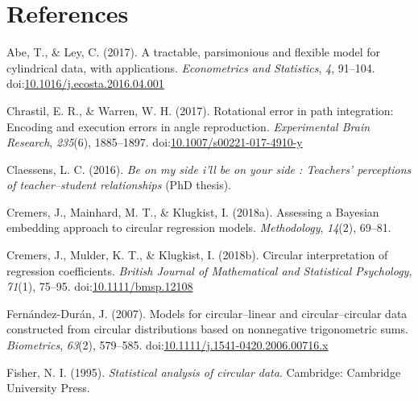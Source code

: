 \documentclass[man,mask]{apa6}
\DeclareRobustCommand{\VANDER}[3]{#2}
\DeclareRobustCommand{\VAN}[3]{#2}
\DeclareRobustCommand{\DEN}[3]{#2}
\begin{document}
\newpage
\vspace{-0.75cm}
\section*{{\normalfont References}}
\vspace{-0.75cm}

\DeclareRobustCommand{\VANDER}[3]{#3}
\DeclareRobustCommand{\VAN}[3]{#3}
\DeclareRobustCommand{\DEN}[3]{#3}

\hypertarget{refs}{}
\leavevmode\hypertarget{ref-abe2017tractable}{}%
Abe, T., \& Ley, C. (2017). A tractable, parsimonious and flexible model for cylindrical data, with applications. \emph{Econometrics and Statistics}, \emph{4}, 91--104. doi:\href{https://doi.org/10.1016/j.ecosta.2016.04.001}{10.1016/j.ecosta.2016.04.001}

\leavevmode\hypertarget{ref-chrastil2017rotational}{}%
Chrastil, E. R., \& Warren, W. H. (2017). Rotational error in path integration: Encoding and execution errors in angle reproduction. \emph{Experimental Brain Research}, \emph{235}(6), 1885--1897. doi:\href{https://doi.org/10.1007/s00221-017-4910-y}{10.1007/s00221-017-4910-y}

\leavevmode\hypertarget{ref-Claessens2016side}{}%
Claessens, L. C. (2016). \emph{Be on my side i'll be on your side : Teachers' perceptions of teacher--student relationships} (PhD thesis).

\leavevmode\hypertarget{ref-Cremers2018Assessing}{}%
Cremers, J., Mainhard, M. T., \& Klugkist, I. (2018a). Assessing a Bayesian embedding approach to circular regression models. \emph{Methodology}, \emph{14}(2), 69--81.

\leavevmode\hypertarget{ref-CremersMulderKlugkist2017}{}%
Cremers, J., Mulder, K. T., \& Klugkist, I. (2018b). Circular interpretation of regression coefficients. \emph{British Journal of Mathematical and Statistical Psychology}, \emph{71}(1), 75--95. doi:\href{https://doi.org/10.1111/bmsp.12108}{10.1111/bmsp.12108}

\leavevmode\hypertarget{ref-fernandez2007models}{}%
Fernández-Durán, J. (2007). Models for circular--linear and circular--circular data constructed from circular distributions based on nonnegative trigonometric sums. \emph{Biometrics}, \emph{63}(2), 579--585. doi:\href{https://doi.org/10.1111/j.1541-0420.2006.00716.x}{10.1111/j.1541-0420.2006.00716.x}

\leavevmode\hypertarget{ref-fisher1995statistical}{}%
Fisher, N. I. (1995). \emph{Statistical analysis of circular data}. Cambridge: Cambridge University Press.
\end{document}
